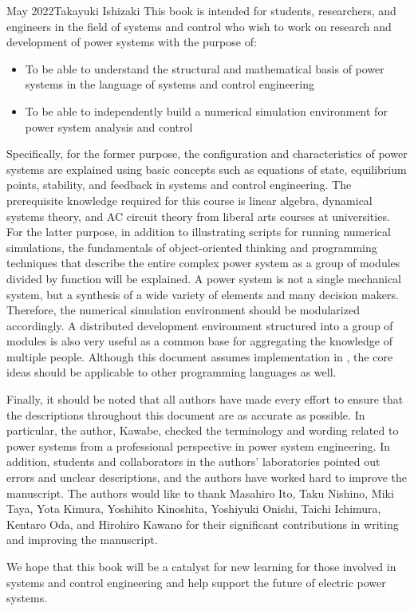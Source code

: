 \begin{preface}{May 2022}{Takayuki Ishizaki}
This book is intended for students, researchers, and engineers in the field of systems and control who wish to work on research and development of power systems with the purpose of:
\begin{itemize}
\item To be able to understand the structural and mathematical basis of power systems in the language of systems and control engineering
\item To be able to independently build a numerical simulation environment for power system analysis and control
\end{itemize}
Specifically, for the former purpose, the configuration and characteristics of power systems are explained using basic concepts such as equations of state, equilibrium points, stability, and feedback in systems and control engineering.
The prerequisite knowledge required for this course is linear algebra, dynamical systems theory, and AC circuit theory from liberal arts courses at universities.
For the latter purpose, in addition to illustrating scripts for running numerical simulations, the fundamentals of object-oriented thinking and programming techniques that describe the entire complex power system as a group of modules divided by function will be explained.
A power system is not a single mechanical system, but a synthesis of a wide variety of elements and many decision makers.
Therefore, the numerical simulation environment should be modularized accordingly.
A distributed development environment structured into a group of modules is also very useful as a common base for aggregating the knowledge of multiple people.
Although this document assumes implementation in \matlab, the core ideas should be applicable to other programming languages as well.

Finally, it should be noted that all authors have made every effort to ensure that the descriptions throughout this document are as accurate as possible.
In particular, the author, Kawabe, checked the terminology and wording related to power systems from a professional perspective in power system engineering.
In addition, students and collaborators in the authors' laboratories pointed out errors and unclear descriptions, and the authors have worked hard to improve the manuscript.
The authors would like to thank Masahiro Ito, Taku Nishino, Miki Taya, Yota Kimura, Yoshihito Kinoshita, Yoshiyuki Onishi, Taichi Ichimura, Kentaro Oda, and Hirohiro Kawano for their significant contributions in writing and improving the manuscript.

We hope that this book will be a catalyst for new learning for those involved in systems and control engineering and help support the future of electric power systems.

\end{preface}